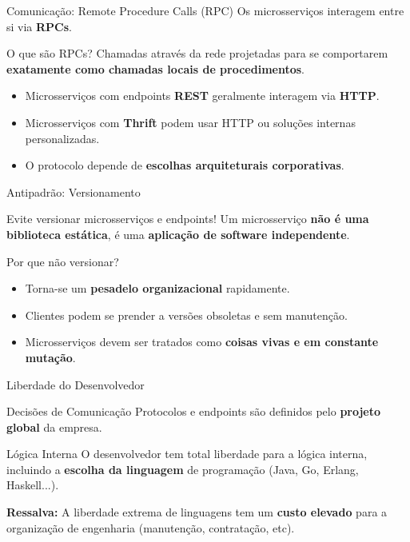 \documentclass[aspectratio=169]{beamer}
\begin{document}
\begin{frame}{Comunicação: Remote Procedure Calls (RPC)}
    Os microsserviços interagem entre si via \textbf{RPCs}.
    \vspace{0.3cm}
    \begin{block}{O que são RPCs?}
        Chamadas através da rede projetadas para se comportarem \textbf{exatamente como chamadas locais de procedimentos}.
    \end{block}
    \vspace{0.3cm}
    \begin{itemize}
        \item Microsserviços com endpoints \textbf{REST} geralmente interagem via \textbf{HTTP}.
        \item Microsserviços com \textbf{Thrift} podem usar HTTP ou soluções internas personalizadas.
        \item O protocolo depende de \textbf{escolhas arquiteturais corporativas}.
    \end{itemize}
\end{frame}

\begin{frame}{Antipadrão: Versionamento}
    \begin{alertblock}{Evite versionar microsserviços e endpoints!}
        Um microsserviço \textbf{não é uma biblioteca estática}, é uma \textbf{aplicação de software independente}.
    \end{alertblock}
    \vspace{0.3cm}
    Por que não versionar?
    \begin{itemize}
        \item Torna-se um \textbf{pesadelo organizacional} rapidamente.
        \item Clientes podem se prender a versões obsoletas e sem manutenção.
        \item Microsserviços devem ser tratados como \textbf{coisas vivas e em constante mutação}.
    \end{itemize}
\end{frame}

\begin{frame}{Liberdade do Desenvolvedor}
    \begin{block}{Decisões de Comunicação}
        Protocolos e endpoints são definidos pelo \textbf{projeto global} da empresa.
    \end{block}
    \vspace{0.2cm}
    \begin{block}{Lógica Interna}
        O desenvolvedor tem total liberdade para a lógica interna, incluindo a \textbf{escolha da linguagem} de programação (Java, Go, Erlang, Haskell...).
    \end{block}
    \vspace{0.2cm}
    \centering
    \textcolor{meuvermelhoescuro}{\textbf{Ressalva:}} A liberdade extrema de linguagens tem um \textbf{custo elevado} para a organização de engenharia (manutenção, contratação, etc).
\end{frame}
\end{document}
